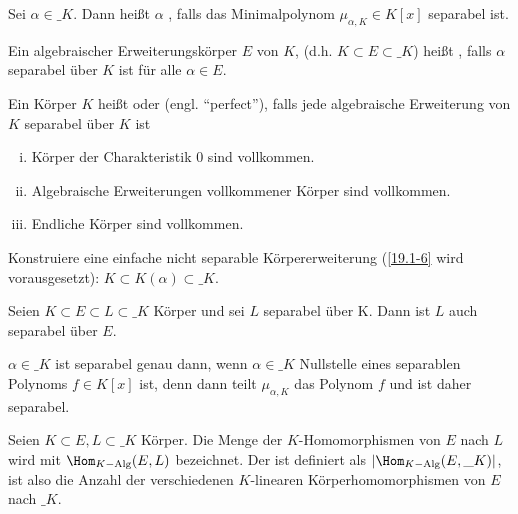 \begin{df} \label{dup:19.1-9}
	Sei $\alpha \in \_K$.
	Dann heißt $\alpha$ , falls das Minimalpolynom $\mu_{\alpha, K} \in K[x]$ separabel ist.

	Ein algebraischer Erweiterungskörper $E$ von $K$, (d.h. $K \subset E \subset \_K$) heißt , falls $\alpha$ separabel über $K$ ist für alle $\alpha \in E$.

	Ein Körper $K$ heißt  oder  (engl. “perfect”), falls jede algebraische Erweiterung von $K$ separabel über $K$ ist
\end{df}

\setcounter{thm}{5}
\begin{kor} \label{19.1-6}
	\begin{enumerate}[i)]
		\item
			Körper der Charakteristik $0$ sind vollkommen.
		\item
			Algebraische Erweiterungen vollkommener Körper sind vollkommen.
		\item
			Endliche Körper sind vollkommen.
	\end{enumerate}
\end{kor}

\begin{ex} \label{dup:19.1-7}
	Konstruiere eine einfache nicht separable Körpererweiterung (\ref{19.1-6} wird vorausgesetzt): $K \subset K(\alpha) \subset \_K$.
\end{ex}

\begin{lem} \label{19.1-8}
	Seien $K \subset E \subset L \subset \_K$ Körper und sei $L$ separabel über K.
	Dann ist $L$ auch separabel über $E$.
\end{lem}

\begin{nt} \label{19.1-9}
	$\alpha \in \_K$ ist separabel genau dann, wenn $\alpha \in \_K$ Nullstelle eines separablen Polynoms $f \in K[x]$ ist, denn dann teilt $\mu_{\alpha, K}$ das Polynom $f$ und ist daher separabel.
\end{nt}

\begin{df} \label{19.1-10}
	Seien $K \subset E, L \subset \_K$ Körper.
	Die Menge der $K$-Homomorphismen von $E$ nach $L$ wird mit $\Hom_{K-\text{Alg}}(E, L)$ bezeichnet.
	Der  ist definiert als $|\Hom_{K-\text{Alg}}(E, \_K)|$, ist also die Anzahl der verschiedenen $K$-linearen Körperhomomorphismen von $E$ nach $\_K$.
\end{df}

